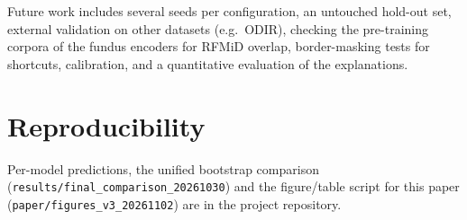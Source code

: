 ﻿\documentclass[conference]{IEEEtran}
\begin{document}
Future work includes several seeds per configuration, an untouched hold-out set, external validation on other datasets (e.g.\ ODIR), checking the pre-training corpora of the fundus encoders for RFMiD overlap, border-masking tests for shortcuts, calibration, and a quantitative evaluation of the explanations.

\section*{Reproducibility}
Per-model predictions, the unified bootstrap comparison (\texttt{results/final\_comparison\_20261030}) and the figure/table script for this paper (\texttt{paper/figures\_v3\_20261102}) are in the project repository.



\end{document}
